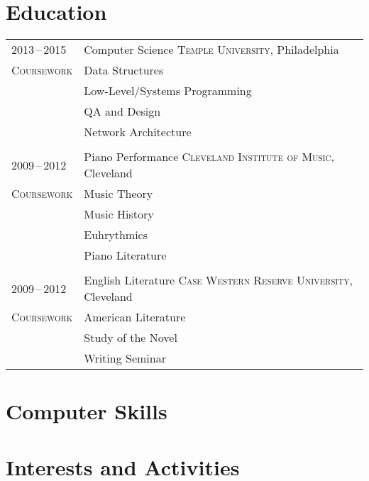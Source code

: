 \documentclass[a4paper,10pt]{article}
\begin{document}
\section{Education}
\begin{tabularx}{\textwidth}{@{}p{6em}|X@{}}
    2013\,--\,2015 & Computer Science \hfill \textsc{Temple University}, Philadelphia \\
    \textsc{Coursework} & \footnotesize{Data Structures} \\
    & \footnotesize{Low-Level/Systems Programming} \\
    & \footnotesize{QA and Design} \\
    & \footnotesize{Network Architecture} \\
    \multicolumn{2}{c}{} \\
    2009\,--\,2012 & Piano Performance \hfill \textsc{Cleveland Institute of Music}, Cleveland \\
    \textsc{Coursework} & \footnotesize{Music Theory} \\
    & \footnotesize{Music History} \\
    & \footnotesize{Euhrythmics} \\
    & \footnotesize{Piano Literature} \\
    \multicolumn{2}{c}{} \\
    2009\,--\,2012 & English Literature \hfill \textsc{Case Western Reserve University}, Cleveland \\
    \textsc{Coursework} & \footnotesize{American Literature} \\
    & \footnotesize{Study of the Novel} \\
    & \footnotesize{Writing Seminar}
\end{tabularx}

\section{Computer Skills}

\section{Interests and Activities}
\end{document}
